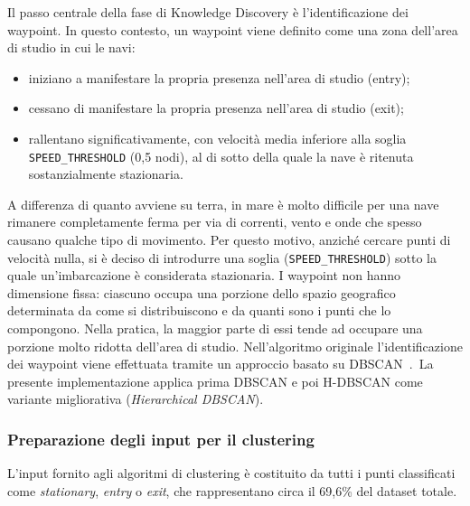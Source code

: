 Il passo centrale della fase di Knowledge Discovery è l'identificazione dei waypoint. In questo
contesto, un waypoint viene definito come una zona dell'area di studio in cui le navi:
\begin{itemize}
    \item iniziano a manifestare la propria presenza nell'area di studio (entry);
    \item cessano di manifestare la propria presenza nell'area di studio (exit);
    \item rallentano significativamente, con velocità media inferiore alla soglia
          \texttt{SPEED\_\allowbreak{}THRESHOLD} (0,5 nodi), al di sotto della quale la nave è ritenuta
          sostanzialmente stazionaria.
\end{itemize}
A differenza di quanto avviene su terra, in mare è molto difficile per una nave
rimanere completamente ferma per via di correnti, vento e onde che spesso causano qualche tipo di movimento. 
Per questo motivo, anziché cercare punti di velocità nulla, si è deciso di introdurre una soglia
(\texttt{SPEED\_THRESHOLD}) sotto la quale un'imbarcazione è considerata stazionaria. 
I waypoint non hanno dimensione fissa: ciascuno occupa una porzione dello spazio geografico 
determinata da come si distribuiscono e da quanti sono i punti che lo compongono. Nella pratica, la maggior parte di essi 
tende ad occupare una porzione molto ridotta dell'area di studio.
Nell'algoritmo originale l'identificazione dei waypoint viene effettuata tramite un approccio basato su DBSCAN~\cite{ester1996}.\
La presente implementazione applica prima DBSCAN e poi H-DBSCAN come variante
migliorativa (\emph{Hierarchical DBSCAN}).

\subsubsection{Preparazione degli input per il clustering}
 
L'input fornito agli algoritmi di clustering è costituito da tutti i punti classificati come 
\emph{stationary}, \emph{entry} o \emph{exit}, che rappresentano circa il 69,6\% del dataset totale.

